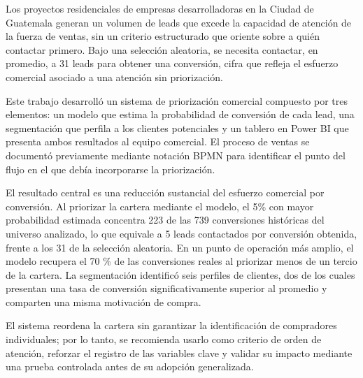 Los proyectos residenciales de empresas desarrolladoras en la Ciudad de Guatemala generan un volumen de leads que excede la capacidad de atención de la fuerza de ventas, sin un criterio estructurado que oriente sobre a quién contactar primero. Bajo una selección aleatoria, se necesita contactar, en promedio, a 31 leads para obtener una conversión, cifra que refleja el esfuerzo comercial asociado a una atención sin priorización.

Este trabajo desarrolló un sistema de priorización comercial compuesto por tres elementos: un modelo que estima la probabilidad de conversión de cada lead, una segmentación que perfila a los clientes potenciales y un tablero en Power BI que presenta ambos resultados al equipo comercial. El proceso de ventas se documentó previamente mediante notación BPMN para identificar el punto del flujo en el que debía incorporarse la priorización.

El resultado central es una reducción sustancial del esfuerzo comercial por conversión. Al priorizar la cartera mediante el modelo, el 5\% con mayor probabilidad estimada concentra 223 de las 739 conversiones históricas del universo analizado, lo que equivale a 5 leads contactados por conversión obtenida, frente a los 31 de la selección aleatoria. En un punto de operación más amplio, el modelo recupera el 70 \% de las conversiones reales al priorizar menos de un tercio de la cartera. La segmentación identificó seis perfiles de clientes, dos de los cuales presentan una tasa de conversión significativamente superior al promedio y comparten una misma motivación de compra.

El sistema reordena la cartera sin garantizar la identificación de compradores individuales; por lo tanto, se recomienda usarlo como criterio de orden de atención, reforzar el registro de las variables clave y validar su impacto mediante una prueba controlada antes de su adopción generalizada.
